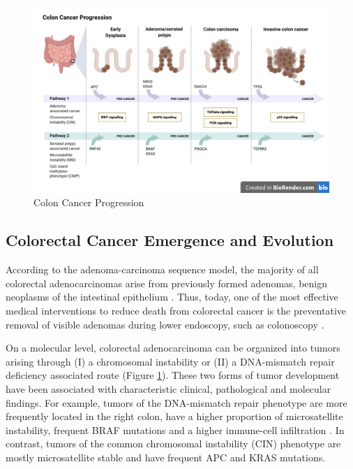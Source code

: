\begin{flushleft}
\begin{figure}[h]
\centering
\includegraphics[scale=.35]{figures/colon_cancer_progression.png}
\caption{Colon Cancer Progression}
\label{colon_cancer_progression}
\end{figure}

\subsection{Colorectal Cancer Emergence and Evolution}
According to the adenoma-carcinoma sequence model, the majority of all colorectal adenocarcinomas arise from previously formed adenomas, benign neoplasms of the intestinal epithelium \cite{Cho1992}. Thus, today, one of the most effective medical interventions to reduce death from colorectal cancer is the preventative removal of visible adenomas during lower endoscopy, such as colonoscopy \cite{Nishihara2013Long-TermEndoscopy}.\par

On a molecular level, colorectal adenocarcinoma can be organized into tumors arising through (I) a chromosomal instability or (II) a DNA-mismatch repair deficiency associated route \cite{Markowitz2009} (Figure \ref{colon_cancer_progression}). These two forms of tumor development have been associated with characteristic clinical, pathological and molecular findings. For example, tumors of the DNA-mismatch repair phenotype are more frequently located in the right colon, have a higher proportion of microsatellite instability, frequent BRAF mutations and a higher immune-cell infiltration \cite{Markowitz2009}. In contrast, tumors of the common chromosomal instability (CIN) phenotype are mostly microsatellite stable and have frequent APC and KRAS mutations. \par 


\end{flushleft}
